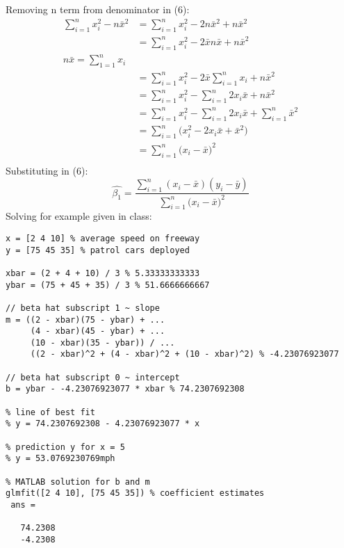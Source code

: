 \documentclass{article}
\begin{document}
Removing n term from denominator in (6):
\begin{align*}
\sum_{i=1}^{n}x_i^2 - n\bar{x}^2 & = \sum_{i=1}^{n}x_i^2 - 2n\bar{x}^2 + n\bar{x}^2 \\ %
& = \sum_{i=1}^{n}x_i^2 - 2\bar{x}n\bar{x} + n\bar{x}^2 \\ %
n\bar{x} = \sum_{1=1}^{n}x_i \\ %
& = \sum_{i=1}^{n}x_i^2 - 2\bar{x}\sum_{i=1}^{n}x_i + n\bar{x}^2 \\
& = \sum_{i=1}^{n}x_i^2 - \sum_{i=1}^{n}2x_i\bar{x} + n\bar{x}^2 \\
& = \sum_{i=1}^{n}x_i^2 - \sum_{i=1}^{n}2x_i\bar{x} + \sum_{i=1}^{n}\bar{x}^2 \\
& = \sum_{i=1}^{n}\big(x_i^2 - 2x_i\bar{x} + \bar{x}^2\big) \\
& = \sum_{i=1}^{n}\big(x_i - \bar{x}\big)^2 \\
\end{align*}
Substituting in (6):
\begin{equation}
\hat{\beta_1}=  \frac{\sum_{i=1}^{n}(x_i - \bar{x})(y_i - \bar{y})}{\sum_{i=1}^{n}\big(x_i - \bar{x}\big)^2}  \label{eq:7}
\end{equation}
Solving for example given in class:
\begin{verbatim}
x = [2 4 10] % average speed on freeway
y = [75 45 35] % patrol cars deployed

xbar = (2 + 4 + 10) / 3 % 5.33333333333
ybar = (75 + 45 + 35) / 3 % 51.6666666667

// beta hat subscript 1 ~ slope
m = ((2 - xbar)(75 - ybar) + ...
     (4 - xbar)(45 - ybar) + ...
     (10 - xbar)(35 - ybar)) / ...
     ((2 - xbar)^2 + (4 - xbar)^2 + (10 - xbar)^2) % -4.23076923077
     
// beta hat subscript 0 ~ intercept
b = ybar - -4.23076923077 * xbar % 74.2307692308

% line of best fit
% y = 74.2307692308 - 4.23076923077 * x

% prediction y for x = 5
% y = 53.0769230769mph

% MATLAB solution for b and m
glmfit([2 4 10], [75 45 35]) % coefficient estimates
 ans =

   74.2308
   -4.2308
\end{verbatim}
\end{document}
